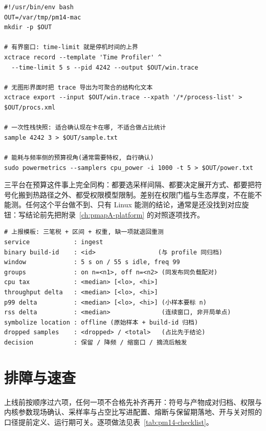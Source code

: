 \documentclass[12pt,a4paper,fontset=fandol]{ctexbook}
\begin{document}
\begin{lstlisting}[style=shellstyle, caption={macOS 有界窗口采样与导出骨架（形态示意：权限要求请自行确认；样本里不落业务内容）}, label={lst:pm14-mac}]
#!/usr/bin/env bash
OUT=/var/tmp/pm14-mac
mkdir -p $OUT

# 有界窗口: time-limit 就是停机时间的上界
xctrace record --template 'Time Profiler' ^
  --time-limit 5 s --pid 4242 --output $OUT/win.trace

# 无图形界面时把 trace 导出为可聚合的结构化文本
xctrace export --input $OUT/win.trace --xpath '/*/process-list' > $OUT/procs.xml

# 一次性栈快照: 适合确认现在卡在哪, 不适合做占比统计
sample 4242 3 > $OUT/sample.txt

# 能耗与频率侧的预算视角(通常需要特权, 自行确认)
sudo powermetrics --samplers cpu_power -i 1000 -t 5 > $OUT/power.txt
\end{lstlisting}

三平台在预算这件事上完全同构：都要选采样间隔、都要决定展开方式、都要把符号化搬到热路径之外、都受权限模型限制。差别在权限门槛与生态厚度，不在能不能测。任何这个平台做不到、只有 Linux 能测的结论，通常是还没找到对应旋钮：写结论前先把附录~\ref{ch:pmapA-platform} 的对照逐项找齐。

\begin{lstlisting}[style=outstyle, caption={开销上报的形态示例（格式示例，数值位置以尖括号占位，非本仓库实测值）}, label={lst:pm14-report}]
# 上报模板: 三笔税 + 区间 + 权重, 缺一项就退回重测
service            : ingest
binary build-id    : <id>                 (与 profile 同归档)
window             : 5 s on / 55 s idle, freq 99
groups             : on n=<n1>, off n=<n2> (同发布同负载配对)
cpu tax            : <median> [<lo>, <hi>]
throughput delta   : <median> [<lo>, <hi>]
p99 delta          : <median> [<lo>, <hi>] (小样本要标 n)
rss delta          : <median>              (连续窗口, 非开局单点)
symbolize location : offline (原始样本 + build-id 归档)
dropped samples    : <dropped> / <total>   (占比先于结论)
decision           : 保留 / 降频 / 缩窗口 / 摘流后触发
\end{lstlisting}

\section{排障与速查}
\label{sec:pm14-trouble}

\begin{bestpractice}[title={开线上采样的六项确认}]
\label{box:pm14-checklist-box}
上线前按顺序过六项，任何一项不合格先补齐再开：符号与产物成对归档、权限与内核参数现场确认、采样率与占空比写进配置、熔断与保留期落地、开与关对照的口径提前定义、运行期可关。逐项做法见表~\ref{tab:pm14-checklist}。
\end{bestpractice}
\end{document}
